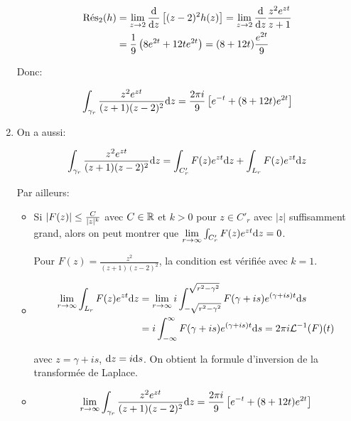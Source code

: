 \begin{example}[3]
\begin{enumerate}
        \begin{align*}
            \Res_2(h)
            &= \lim_{z \rightarrow 2} \frac{\dd}{\dz} \left[ (z - 2)^2 h(z) \right]
            = \lim_{z \rightarrow 2} \frac{\dd}{\dz} \frac{z^2 e^{zt}}{z+1}
            \\&= \frac{1}{9} \left( 8 e^{2t} + 12t e^{2t} \right)
            = (8 + 12t) \frac{e^{2t}}{9}
        \end{align*}
        
        Donc:
        
        \[ \int_{\gamma_r} \frac{z^2 e^{zt}}{(z+1)(z-2)^2} \dz = \frac{2 \pi i}{9} \left[ e^{-t} + (8 + 12t) e^{2t} \right] \]
        
        \item 
        On a aussi:
        
        \[
            \int_{\gamma_r} \frac{z^2 e^{zt}}{(z+1)(z-2)^2} \dz
            = \int_{C'_r} F(z) e^{zt} \dz + \int_{L_r} F(z) e^{zt} \dz
        \]
        
        Par ailleurs:
        \begin{itemize}
            \item 
            Si $\module{F(z)} \leq \frac{C}{|z|^k}$ avec $C \in \R$ et $k > 0$ pour $z \in C'_r$ avec $|z|$ suffisamment grand, alors on peut montrer que $\lim\limits_{r \rightarrow \infty} \int_{C'_r} F(z)e^{zt} \dz = 0$.
            
            Pour $F(z) = \frac{z^2}{(z+1)(z-2)^2}$, la condition est vérifiée avec $k = 1$.
            
            \item 
            \begin{align*}
                \lim_{r \rightarrow \infty} \int_{L_r} F(z) e^{zt} \dz
                &= \lim_{r \rightarrow \infty}
                i \int_{-\sqrt{r^2 - \gamma^2}}^{\sqrt{r^2 - \gamma^2}} F(\gamma + is) e^{(\gamma + is)t} \ds
                \\&= i \int_{-\infty}^\infty F(\gamma + is) e^{(\gamma + is)t} \ds
                = 2 \pi i \TLi(F)(t)
            \end{align*}
            
            avec $z = \gamma + is$, $\dz = i \ds$.
            On obtient la formule d'inversion de la transformée de Laplace.
            
            \item 
            \[
                \lim\limits_{r \rightarrow \infty} \int_{\gamma_r} \frac{z^2 e^{zt}}{(z+1)(z-2)^2} \dz
                = \frac{2 \pi i}{9} \left[ e^{-t} + (8 + 12t) e^{2t} \right]
            \]
        \end{itemize}
    \end{enumerate}


\end{example}
